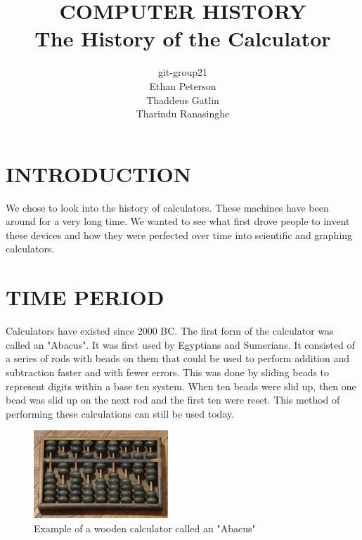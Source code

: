 \documentclass[letterpaper, 10 pt, conference]{IEEEconf}
\title{\LARGE \bf
COMPUTER HISTORY\\
\large The History of the Calculator
}
\author{git-group21\\
\small Ethan Peterson\\
\small Thaddeus Gatlin\\
\small Tharindu Ranasinghe\\
}
\begin{document}
\maketitle
\thispagestyle{empty}
\pagestyle{empty}




\section{INTRODUCTION}

We chose to look into the history of calculators. These machines have been around for a very long time. We wanted to see what first drove people to invent these devices and how they were perfected over time into scientific and graphing calculators. 

\section{TIME PERIOD}

Calculators have existed since 2000 BC. The first form of the calculator was called an "Abacus". It was first used by Egyptians and Sumerians. It consisted of a series of rods with beads on them that could be used to perform addition and subtraction faster and with fewer errors. This was done by sliding beads to represent digits within a base ten system. When ten beads were slid up, then one bead was slid up on the next rod and the first ten were reset. This method of performing these calculations can still be used today.
\begin{figure}[h!]
\centering
\includegraphics[width=0.45\textwidth]{abacus_pic.jpg}
\caption{Example of a wooden calculator called an "Abacus"}
\label{fig:example}
\end{figure}

\end{document}

